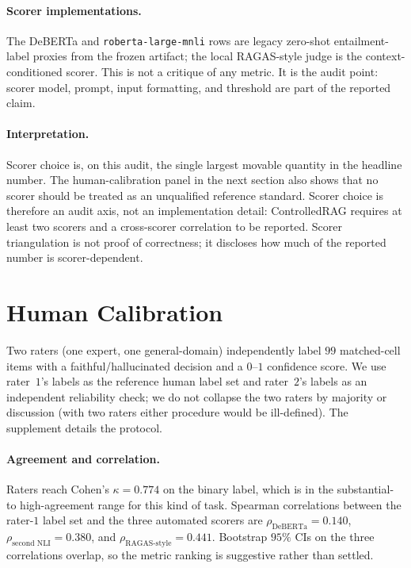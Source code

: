 \paragraph{Scorer implementations.} The DeBERTa and
\texttt{roberta-large-mnli} rows are legacy zero-shot entailment-label
proxies from the frozen artifact; the local RAGAS-style judge is the
context-conditioned scorer. This is not a critique of any metric. It is
the audit point: scorer model, prompt, input formatting, and threshold
are part of the reported claim.

\paragraph{Interpretation.} Scorer choice is, on this audit, the single
largest movable quantity in the headline number. The human-calibration
panel in the next section also shows that no scorer should be treated as
an unqualified reference standard. Scorer choice is therefore an audit axis,
not an implementation detail: ControlledRAG requires at least two
scorers and a cross-scorer correlation to be reported. Scorer
triangulation is not proof of correctness; it discloses how much of the
reported number is scorer-dependent.

\section{Human Calibration}
\label{sec:human_cal}

Two raters (one expert, one general-domain) independently label $99$
matched-cell items with a faithful/hallucinated decision and a
$0$--$1$ confidence score. We use rater~$1$'s labels as the reference
human label set and rater~$2$'s labels as an independent reliability
check; we do not collapse the two raters by majority or discussion
(with two raters either procedure would be ill-defined). The supplement
details the protocol.

\paragraph{Agreement and correlation.} Raters reach Cohen's
$\kappa = 0.774$ on the binary label, which is in the substantial-
to high-agreement range for this kind of task. Spearman correlations
between the rater-$1$ label set and the three automated scorers are
$\rho_{\textrm{DeBERTa}} = 0.140$,
$\rho_{\textrm{second NLI}} = 0.380$, and
$\rho_{\textrm{RAGAS-style}} = 0.441$. Bootstrap $95\%$ CIs on the
three correlations overlap, so the metric ranking is suggestive
rather than settled.

